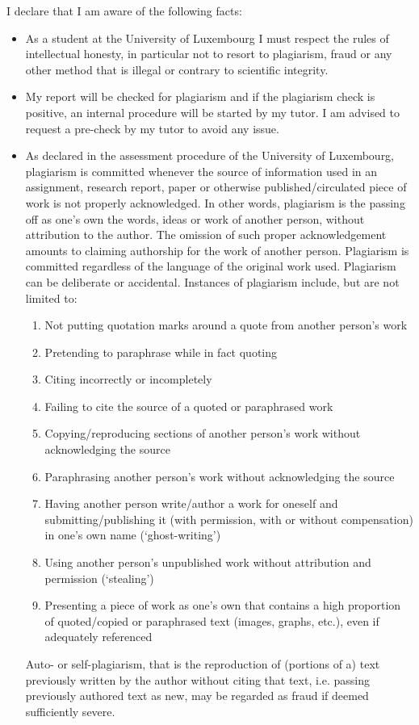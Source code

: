 \documentclass[conference,compsoc]{IEEEtran}
\begin{document}
\newline
I declare that I am aware of the following facts:
\begin{itemize}
	\item As a student at the University of Luxembourg I must respect the rules of intellectual honesty, in particular not to resort to plagiarism, fraud or any other method that is illegal or contrary to scientific integrity.
	\item My report will be checked for plagiarism and if the plagiarism check is positive, an internal procedure will be started by my tutor. I am advised to request a pre-check by my tutor to avoid any issue.
	\item As declared in the assessment procedure of the University of Luxembourg, plagiarism is committed whenever the source of information used in an assignment, research report, paper or otherwise published/circulated piece of work is not properly acknowledged. In other words, plagiarism is the passing off as one’s own the words, ideas or work of another person, without attribution to the author. The omission of such proper acknowledgement amounts to claiming authorship for the work of another person. Plagiarism is committed regardless of the language of the original work used. Plagiarism can be deliberate or accidental.
Instances of plagiarism include, but are not limited to:
\begin{enumerate}
  \item Not putting quotation marks around a quote from another person’s work
  \item Pretending to paraphrase while in fact quoting
  \item Citing incorrectly or incompletely
  \item Failing to cite the source of a quoted or paraphrased work
  \item Copying/reproducing sections of another person’s work without acknowledging the source
  \item Paraphrasing another person’s work without acknowledging the source
  \item Having another person write/author a work for oneself and submitting/publishing it (with permission, with or without compensation) in one’s own name (‘ghost-writing’)
  \item Using another person’s unpublished work without attribution and permission (‘stealing’)
  \item Presenting a piece of work as one’s own that contains a high proportion of quoted/copied or paraphrased text (images, graphs, etc.), even if adequately referenced
\end{enumerate}
Auto- or self-plagiarism, that is the reproduction of (portions of a) text previously written by the author without citing that text, i.e. passing previously authored text as new, may be regarded as fraud if deemed sufficiently severe.
\end{itemize}
\end{document}
